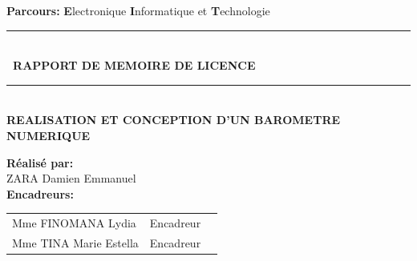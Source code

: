 \documentclass[a4paper,12pt]{report}
\begin{document}
\begin{titlepage}
\begin{center}
\textsc{\Large}
{\large \bfseries Parcours: }
{\large \textbf{E}lectronique \textbf{I}nformatique et \textbf{T}echnologie }\\[1cm]




\rule{\linewidth}{0.2mm} \\[0.4cm]
{ \bfseries\ RAPPORT DE MEMOIRE DE LICENCE \\[0.1cm] }
\rule{\linewidth}{0.2mm} \\[3cm]



\textsc{\huge}
{\huge \bfseries\color{blue} REALISATION ET CONCEPTION D'UN BAROMETRE NUMERIQUE  \\[3cm] }



\begin{minipage}{0.8\textwidth}
  \begin{flushleft} \large
    \large \textbf{Réalisé par:}\\
    \setlength{\indent}
    \textsc{ZARA} Damien Emmanuel \\[1cm]
    \large \textbf{Encadreurs:}\\
    	\begin{center}
    		\begin{tabular}{l@{\hskip 1cm}l@{\hskip 1cm}l}
				Mme \textsc{FINOMANA} Lydia   & Encadreur \\
				Mme  \textsc{TINA} Marie Estella & Encadreur\\
			\end{tabular}\\[5mm]
    	
    	\end{center}
    
    
    



\end{flushleft}
\end{minipage}
\end{center}
\end{titlepage}
\end{document}
